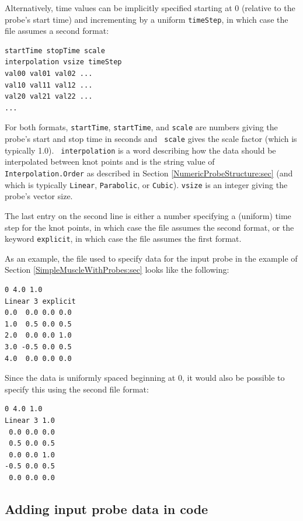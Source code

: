 Alternatively, time values can be implicitly specified starting at 0
(relative to the probe's start time) and incrementing by a uniform
{\tt timeStep}, in which case the file assumes a second format:
%
\begin{lstlisting}[]
startTime stopTime scale
interpolation vsize timeStep
val00 val01 val02 ...
val10 val11 val12 ...
val20 val21 val22 ...
...
\end{lstlisting}
%
For both formats, {\tt startTime}, {\tt startTime}, and {\tt scale}
are numbers giving the probe's start and stop time in seconds and {\tt
scale} gives the scale factor (which is typically 1.0).  {\tt
interpolation} is a word describing how the data should be
interpolated between knot points and is the string value of {\tt
Interpolation.Order} as described in Section
\ref{NumericProbeStructure:sec} (and which is typically {\tt Linear},
{\tt Parabolic}, or {\tt Cubic}). {\tt vsize} is an integer giving the
probe's vector size.

The last entry on the second line is either a number specifying a
(uniform) time step for the knot points, in which case the file
assumes the second format, or the keyword {\tt explicit}, in which
case the file assumes the first format.

As an example, the file used to specify data for the input probe in
the example of Section \ref{SimpleMuscleWithProbes:sec} looks like
the following:
%
\begin{lstlisting}[]
0 4.0 1.0
Linear 3 explicit
0.0  0.0 0.0 0.0 
1.0  0.5 0.0 0.5
2.0  0.0 0.0 1.0
3.0 -0.5 0.0 0.5
4.0  0.0 0.0 0.0
\end{lstlisting}
%
Since the data is uniformly spaced beginning at 0, it would also be
possible to specify this using the second file format:
%
\begin{lstlisting}[]
0 4.0 1.0
Linear 3 1.0
 0.0 0.0 0.0 
 0.5 0.0 0.5
 0.0 0.0 1.0
-0.5 0.0 0.5
 0.0 0.0 0.0
\end{lstlisting}
%

\subsection{Adding input probe data in code}
\label{probeDataInCode:sec}

